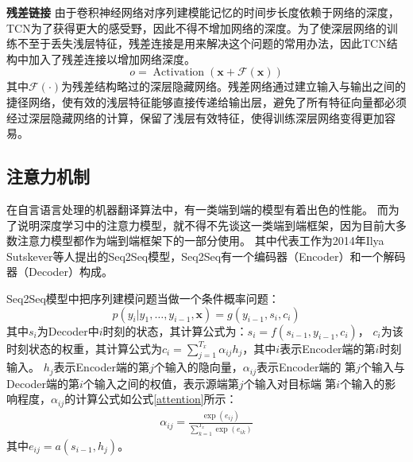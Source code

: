 \textbf{残差链接}
由于卷积神经网络对序列建模能记忆的时间步长度依赖于网络的深度，TCN为了获得更大的感受野，因此不得不增加网络的深度。为了使深层网络的训练不至于丢失浅层特征，残差连接是用来解决这个问题的常用办法，因此TCN结构中加入了残差连接以增加网络深度。
$$
  o=\operatorname{Activation}(\mathbf{x}+\mathcal{F}(\mathbf{x}))
$$
其中$\mathcal{F}(\cdot)$为残差结构略过的深层隐藏网络。残差网络通过建立输入与输出之间的捷径网络，使有效的浅层特征能够直接传递给输出层，避免了所有特征向量都必须经过深层隐藏网络的计算，保留了浅层有效特征，使得训练深层网络变得更加容易。



\subsection{注意力机制}
在自言语言处理的机器翻译算法中，有一类端到端的模型有着出色的性能。
而为了说明深度学习中的注意力模型，就不得不先谈这一类端到端框架，因为目前大多数注意力模型都作为端到端框架下的一部分使用。
其中代表工作为2014年Ilya Sutskever等人提出的Seq2Seq\cite{DBLP:journals/corr/GehringAGYD17}模型，Seq2Seq有一个编码器（Encoder）和一个解码器（Decoder）构成。

Seq2Seq模型中把序列建模问题当做一个条件概率问题：
$$
  p\left(y_{i} | y_{1}, \ldots, y_{i-1}, \mathbf{x}\right)=g\left(y_{i-1}, s_{i}, c_{i}\right)
$$
其中$s_{i}$为Decoder中$i$时刻的状态，其计算公式为：$s_{i}=f\left(s_{i-1}, y_{i-1}, c_{i}\right)$，
$c_{i}$为该时刻状态的权重，其计算公式为$c_{i}=\sum_{j=1}^{T_{x}} \alpha_{ij} h_{j}$，其中$i$表示Encoder端的第$i$时刻输入。
$h_{j}$表示Encoder端的第$j$个输入的隐向量，$\alpha_{i j}$表示Encoder端的%
第$j$个输入与Decoder端的第$i$个输入之间的权值，表示源端第$j$个输入对目标端%
第$i$个输入的影响程度，$\alpha_{i j}$的计算公式如公式\eqref{attention}所示：
\begin{align}
  \alpha_{i j}=\frac{\exp \left(e_{i j}\right)}{\sum_{k=1}^{T_{x}} \exp \left(e_{i k}\right)} \label{attention}
\end{align} 
其中$e_{i j}=a\left(s_{i-1}, h_{j}\right)$。


